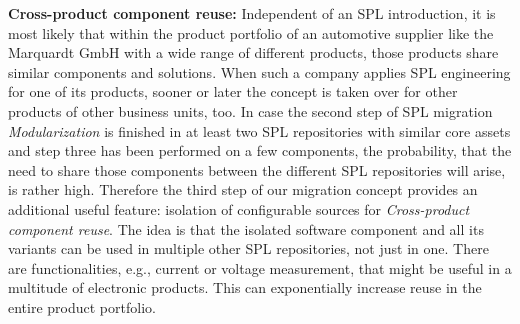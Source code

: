 \textbf{Cross-product component reuse:} Independent of an SPL introduction, it
is most likely that within the product portfolio of an automotive supplier like
the Marquardt GmbH with a wide range of different products, those products share
similar components and solutions. When such a company applies SPL engineering
for one of its products, sooner or later the concept is taken over for other
products of other business units, too. In case the second step of SPL migration
\textit{Modularization} is finished in at least two SPL repositories with
similar core assets and step three has been performed on a few components, the
probability, that the need to share those components between the different SPL
repositories will arise, is rather high. Therefore the third step of our
migration concept provides an additional useful feature: isolation of
configurable sources for \textit{Cross-product component reuse}. The idea is
that the isolated software component and all its variants can be used in
multiple other SPL repositories, not just in one. There are functionalities,
e.g., current or voltage measurement, that might be useful in a multitude of
electronic products. This can exponentially increase reuse in the entire product
portfolio.
